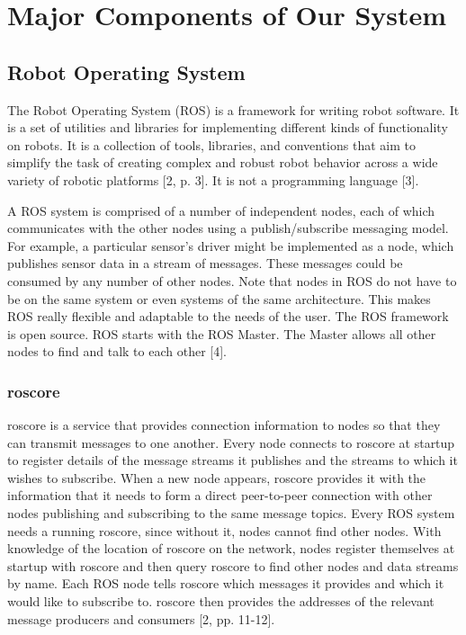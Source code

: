 \documentclass[journal]{IEEEtran}
\begin{document}

\section{Major Components of Our System}

\subsection{Robot Operating System}
The Robot Operating System (ROS) is a framework for writing robot software. It is a set of utilities and libraries for implementing different kinds of functionality on robots. It is a collection of tools, libraries, and conventions that aim to simplify the task of creating complex and robust robot behavior across a wide variety of robotic platforms [2, p. 3]. It is not a programming language [3]. 

A ROS system is comprised of a number of independent nodes, each of which communicates with the other nodes using a publish/subscribe messaging model. For example, a particular sensor’s driver might be implemented as a node, which publishes sensor data in a stream of messages. These messages could be consumed by any number of other nodes.
Note that nodes in ROS do not have to be on the same system or even systems of the same architecture. This makes ROS really flexible and adaptable to the needs of the user. The ROS framework is open source.
ROS starts with the ROS Master. The Master allows all other nodes to find and talk to each other [4]. 

\subsubsection{roscore}
roscore is a service that provides connection information to nodes so that they can
transmit messages to one another. Every node connects to roscore at startup to register
details of the message streams it publishes and the streams to which it wishes to subscribe.
When a new node appears, roscore provides it with the information that it needs to form a
direct peer-to-peer connection with other nodes publishing and subscribing to the same
message topics. Every ROS system needs a running roscore, since without it, nodes
cannot find other nodes.
With knowledge of the location of roscore on the network, nodes register themselves at
startup with roscore and then query roscore to find other nodes and data streams by
name. Each ROS node tells roscore which messages it provides and which it would like
to subscribe to. roscore then provides the addresses of the relevant message producers
and consumers [2, pp. 11-12].
\end{document}
